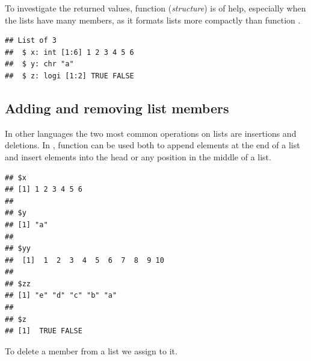 \documentclass[krantz2]{krantz}\usepackage{knitr}
\begin{document}
To investigate the returned values, function  (\emph{structure}) is of help, especially when the lists have many members, as it formats lists more compactly than function .

\begin{knitrout}\footnotesize
{}\color{fgcolor}\begin{kframe}
\begin{alltt}
\end{alltt}
\begin{verbatim}
## List of 3
##  $ x: int [1:6] 1 2 3 4 5 6
##  $ y: chr "a"
##  $ z: logi [1:2] TRUE FALSE
\end{verbatim}
\end{kframe}
\end{knitrout}


\subsection{Adding and removing list members}
In other languages the two most common operations on lists are insertions and deletions. In \Rlang, function  can be used both to append elements at the end of a list and insert elements into the head or any position in the middle of a list.

\begin{knitrout}\footnotesize
{}\color{fgcolor}\begin{kframe}
\begin{alltt}
 \hlkwb{<-}  \hlstd{(} \hlstd{=} \hlopt{:}\hlstd{,}  \hlstd{= letters[}\hlopt{:}\hlstd{]),} \hlstd{)}
\end{alltt}
\begin{verbatim}
## $x
## [1] 1 2 3 4 5 6
## 
## $y
## [1] "a"
## 
## $yy
##  [1]  1  2  3  4  5  6  7  8  9 10
## 
## $zz
## [1] "e" "d" "c" "b" "a"
## 
## $z
## [1]  TRUE FALSE
\end{verbatim}
\end{kframe}
\end{knitrout}

To delete a member from a list we assign  to it.
\end{document}
